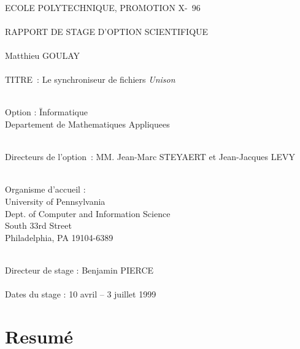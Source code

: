 \documentclass[11pt]{report}
\newcommand{\adv}{Benjamin PIERCE}
\begin{document}
\ \\
ECOLE POLYTECHNIQUE, PROMOTION X-~96\\\\
RAPPORT DE STAGE D'OPTION SCIENTIFIQUE\\\\
Matthieu GOULAY\\\\
TITRE~: Le synchroniseur de fichiers \emph{Unison}\\\\
\begin{tabbing}
Option : \= Informatique                           \\
         \> Departement de Mathematiques Appliquees\\\\
\end{tabbing}
Directeurs de l'option~: MM. Jean-Marc STEYAERT et Jean-Jacques LEVY\\\\
\begin{tabbing}
Organisme d'accueil : \=\\
                      \> University of Pennsylvania\\
                      \> Dept. of Computer and Information Science\\
                       South 33rd Street\\
                      \> Philadelphia, PA  19104-6389\\\\
\end{tabbing}
Directeur de stage : \adv\ \\\\
Dates du stage : 10 avril -- 3 juillet 1999
\newpage
\tableofcontents{}
\newpage
\section*{Resum\'e}
\end{document}
